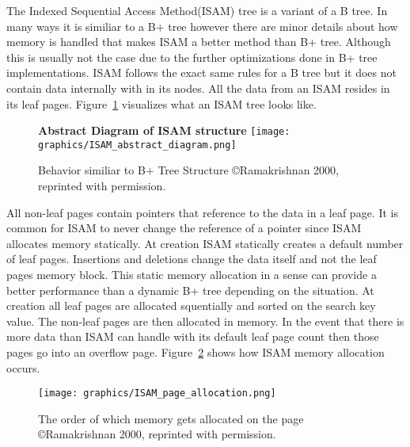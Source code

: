 \documentclass[letterpaper, 11pt]{article}
\begin{document}
The Indexed Sequential Access Method(ISAM) tree is a variant of a B tree. In many ways it is similiar to a B+ tree 
however there are minor details about how memory is handled that makes ISAM a better method than B+ tree. 
Although this is usually not the case due to the further optimizations done in B+ tree implementations. 
ISAM follows the exact same rules for a B tree but it does not contain data internally with in its nodes. 
All the data from an ISAM resides in its leaf pages. Figure~\ref{fig:isam_visual} visualizes what an ISAM tree
looks like.
\par\vspace{\baselineskip}

\begin{figure}[H]
  \centering
  \textbf{Abstract Diagram of ISAM structure}
  \texttt{[image: graphics/ISAM\_abstract\_diagram.png]}
  \caption{Behavior similiar to B+ Tree Structure \copyright Ramakrishnan 2000, reprinted with permission.\cite{ramakrishnan2000database}}
  \label{fig:isam_visual}
\end{figure}

All non-leaf pages contain pointers that reference to the data in a leaf page. It is common for
ISAM to never change the reference of a pointer since ISAM allocates memory statically. At creation
ISAM statically creates a default number of leaf pages. Insertions and deletions change the data
itself and not the leaf pages memory block. This static memory allocation in a sense can
provide a better performance than a dynamic B+ tree depending on the situation. At creation all
leaf pages are allocated squentially and sorted on the search key value. The non-leaf pages
are then allocated in memory. In the event that there is more data than ISAM can handle with its
default leaf page count then those pages go into an overflow page. Figure~\ref{fig:isam_memory} shows 
how ISAM memory allocation occurs.
\par\vspace{\baselineskip}

\begin{figure}[H]
  \centering
  \texttt{[image: graphics/ISAM\_page\_allocation.png]}
  \caption{The order of which memory gets allocated on the page \newline \copyright Ramakrishnan 2000, 
  reprinted with permission.\cite{ramakrishnan2000database}}
  \label{fig:isam_memory}
\end{figure}
\end{document}
